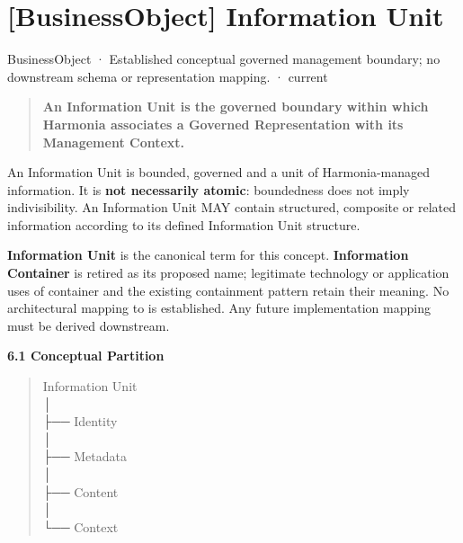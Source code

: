 \section{[BusinessObject] Information Unit}

\label{element:10284034c8534b639284386b064f2c54}
{\small BusinessObject · Established conceptual governed management boundary; no downstream schema or representation mapping. · current}\par

\begin{quote}


\textbf{An Information Unit is the governed boundary within which Harmonia associates a Governed Representation with its Management Context.}



\end{quote}


An Information Unit is bounded, governed and a unit of Harmonia-managed
information. It is \textbf{not necessarily atomic}: boundedness does not imply
indivisibility. An Information Unit MAY contain structured, composite or related
information according to its defined Information Unit structure.



\textbf{Information Unit} is the canonical term for this concept. \textbf{Information
Container} is retired as its proposed name; legitimate technology or application
uses of container and the existing containment pattern retain their meaning.
No architectural mapping to \texttt{} is established. Any future
implementation mapping must be derived downstream.



\par\medskip\textbf{6.1 Conceptual Partition}\par


\begin{quote}\small\ttfamily
Information Unit\\
│\\
├── Identity\\
│\\
├── Metadata\\
│\\
├── Content\\
│\\
└── Context\\

\end{quote}


